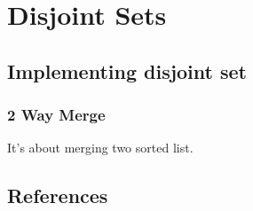 \chapter{Disjoint Sets}
\section{Implementing disjoint set}

\subsection{2 Way Merge}

It's about merging two sorted list.


\section{References}

